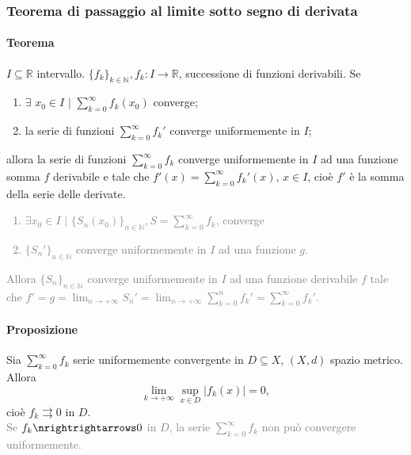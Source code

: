 \documentclass{article}
\newcommand{\R}{\mathbb{R}}
\newcommand{\N}{\mathbb{N}}
\begin{document}
\subsubsection{{Teorema di passaggio al limite sotto segno di derivata}}
\paragraph{{Teorema}}
$I \subseteq \R$ intervallo. $\{f_k\}_{k \in \N}, f_k: I \rightarrow \R$, successione di funzioni derivabili. Se 
\begin{enumerate}
    \item $\exists\,\, x_0\in I \,\, |\,\, \sum_{k=0}^{\infty}f_k(x_0)$ converge;
    \item la serie di funzioni $\sum_{k=0}^{\infty}f_k'$ converge uniformemente in $I$;
\end{enumerate}
allora la serie di funzioni $\sum_{k=0}^{\infty}f_k$ converge uniformemente in $I$ ad una funzione somma $f$ derivabile e tale che $f'(x)= \sum_{k=0}^{\infty}f_k'(x)$, $x \in I$, cioè $f'$ è la somma della serie delle derivate.
\textcolor{grey}{
\begin{enumerate}
    \item $\exists x_0 \in I \,\, |\,\, \{S_n(x_0)\}_{n \in \N}, S= \sum_{k=0}^{\infty}f_k$, converge
    \item $\{S_n'\}_{n \in \N}$ converge uniformemente in $I$ ad una funzione $g$.
\end{enumerate}
Allora $\{S_n\}_{n \in \N}$ converge uniformemente in $I$ ad una funzione derivabile $f$ tale che $f'=g=\lim_{n\rightarrow +\infty} S_n' =\lim_{n\rightarrow +\infty} \sum_{k=0}^{n} f_k'=\sum_{k=0}^{\infty}f_k'$.
}

\paragraph{{Proposizione}}
Sia $\sum_{k=0}^{\infty} f_k$ serie uniformemente convergente in $D \subseteq X$, $(X,d)$ spazio metrico. Allora 
\begin{equation*}
    \lim_{k\rightarrow+\infty}\sup_{x \in D} |f_k(x)|=0,
\end{equation*}
cioè $f_k \rightrightarrows 0$ in $D$.\\
\textcolor{grey}{Se $f_k \nrightrightarrows 0$ in $D$, la serie $\sum_{k=0}^{\infty}f_k$ non può convergere uniformemente.}
\end{document}
